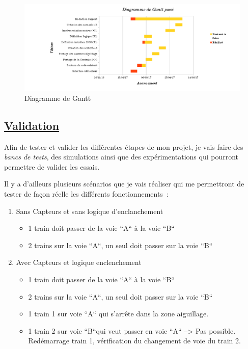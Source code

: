 \begin{figure}[h]
\centering
\includegraphics[scale=0.5]{gantt.png}
\caption{Diagramme de Gantt}
\label{gantt}
\end{figure}



\subsection{\underline{Validation}}
\label{sec:valid}

Afin de tester et valider les diff\'erentes \'etapes de mon projet, je vais
faire des \emph{bancs de tests}, des simulations ainsi que des
exp\'erimentations qui pourront permettre de valider les essais.

Il y a d'ailleurs plusieurs sc\'enarios que je vais r\'ealiser qui
me permettront de tester de façon r\'eelle les différents fonctionnements~:


\begin{enumerate}[A]
  \item Sans Capteurs et sans logique d'enclanchement
  \begin{itemize}
    \item 1 train doit passer de la voie ``A`` à la voie ``B``
    \item 2 trains sur la voie ``A``, un seul doit passer sur la voie
       ``B``
  \end{itemize}

  \item Avec Capteurs et logique enclenchement
  \begin{itemize}
    \item 1 train doit passer de la voie ``A`` à la voie ``B``
    \item 2 trains sur la voie ``A``, un seul doit passer sur la voie ``B``
    \item 1 train 1 sur voie ``A`` qui s'arrête dans la zone aiguillage.
    \item 1 train 2 sur voie ``B``qui veut passer en voie ``A`` --> Pas
       possible. Red\'emarrage train 1, v\'erification du changement de
       voie du train 2.
  \end{itemize}
\end{enumerate}

